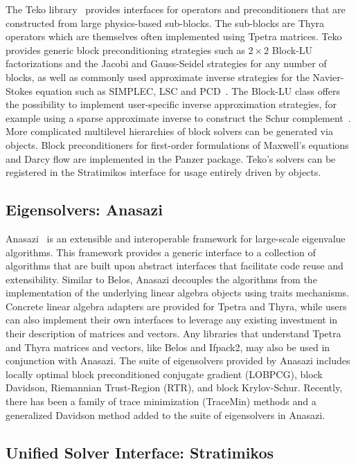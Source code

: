 The Teko library~\cite{Cyr2016a} provides interfaces for operators and preconditioners that are constructed from large physics-based sub-blocks.
The sub-blocks are Thyra operators which are themselves often implemented using Tpetra matrices.
Teko provides generic block preconditioning strategies such as $2\times2$ Block-LU factorizations and the Jacobi and Gauss-Seidel strategies for any number of blocks,
as well as commonly used approximate inverse strategies for the Navier-Stokes equation
such as SIMPLEC, LSC and PCD~\cite{CyrShadidEtAl2012_StabilizationScalableBlockPreconditioning}.
The Block-LU class offers the possibility to implement user-specific inverse approximation strategies,
for example using a sparse approximate inverse to construct the Schur complement~\cite{Firmbach2024a}.
More complicated multilevel hierarchies of block solvers can be generated via  objects.
Block preconditioners for first-order formulations of Maxwell's equations and Darcy flow are implemented in the Panzer package.
Teko's solvers can be registered in the Stratimikos interface for usage entirely driven by  objects.

\subsection{Eigensolvers: Anasazi}
Anasazi~\cite{Baker2009a} is an extensible and interoperable framework for large-scale eigenvalue algorithms.
This framework provides a generic interface to a collection of algorithms that are built upon abstract interfaces
that facilitate code reuse and extensibility.  Similar to Belos, Anasazi decouples the algorithms from the
implementation of the underlying linear algebra objects using traits mechanisms.  Concrete linear algebra adapters
are provided for Tpetra and Thyra, while users can also implement their own interfaces to leverage any existing
investment in their description of matrices and vectors.  Any libraries that understand Tpetra and Thyra matrices
and vectors, like Belos and Ifpack2, may also be used in conjunction with Anasazi.  The suite of eigensolvers provided
by Anasazi includes locally optimal block preconditioned conjugate gradient (LOBPCG), block Davidson, Riemannian Trust-Region
(RTR), and block Krylov-Schur.  Recently, there has been a family of trace minimization (TraceMin) methods and a
generalized Davidson method added to the suite of eigensolvers in Anasazi.


\subsection{Unified Solver Interface: Stratimikos}

